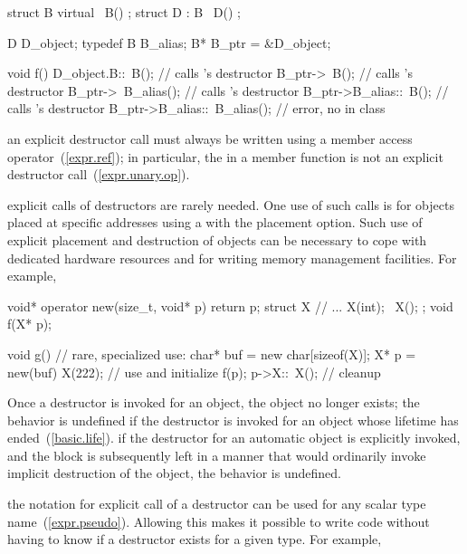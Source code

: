 \begin{codeblock}
struct B {
	virtual ~B() { }
};
struct D : B {
	~D() { }
};

D D_object;
typedef B B_alias;
B* B_ptr = &D_object;

void f() {
	D_object.B::~B();		// calls 's destructor
	B_ptr->~B();			// calls 's destructor
	B_ptr->~B_alias();		// calls 's destructor
	B_ptr->B_alias::~B();		// calls 's destructor
	B_ptr->B_alias::~B_alias();	// error, no  in class 
}
\end{codeblock}
\exitexampleb
\enternote
an explicit destructor call must always be written using
a member access operator~(\ref{expr.ref});
in particular, the
in a member function is not an explicit destructor call~(\ref{expr.unary.op}).
\exitnote

\pnum
\enternote
{}%
explicit calls of destructors are rarely needed.
One use of such calls is for objects placed at specific
addresses using a
with the placement option.
Such use of explicit placement and destruction of objects can be necessary
to cope with dedicated hardware resources and for writing memory management
facilities.
For example,
%

\begin{codeblock}
void* operator new(size_t, void* p) { return p; }
struct X {
    // ...
    X(int);
    ~X();
};
void f(X* p);

void g()			// rare, specialized use:
{
    char* buf = new char[sizeof(X)];
    X* p = new(buf) X(222);     // use  and initialize
    f(p);
    p->X::~X();                 // cleanup
}
\end{codeblock}
\exitnoteb

\pnum
Once a destructor is invoked for an object, the object no longer exists;
the behavior is undefined if the destructor is invoked
for an object whose lifetime has ended~(\ref{basic.life}).
\enterexample
if the destructor for an automatic object is explicitly invoked,
and the block is subsequently left in a manner that would ordinarily
invoke implicit destruction of the object, the behavior is undefined.
\exitexample

\pnum
\enternote
{}%
the notation for explicit call of a destructor can be used for any scalar type
name~(\ref{expr.pseudo}).
Allowing this makes it possible to write code without having to know if a
destructor exists for a given type.
For example,

